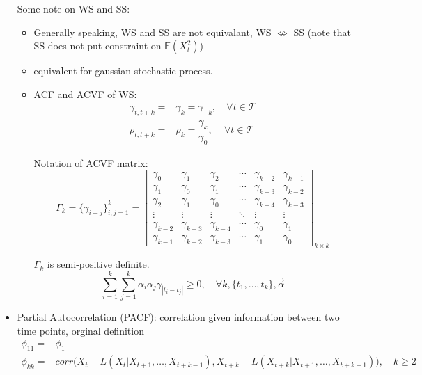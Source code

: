 \begin{itemize}[topsep=2pt,itemsep=0pt]
\begin{itemize}[topsep=2pt,itemsep=0pt]
        \end{itemize}

        Some note on WS and SS:
        \begin{itemize}[topsep=2pt,itemsep=0pt]
            \item Generally speaking, WS and SS are not equivalant, WS $ \nLeftrightarrow $ SS (note that SS does not put constraint on $ \mathbb{E}\left( X_t^2 \right)  $)
            \item equivalent for gaussian stochastic process.
            \item ACF and ACVF of WS: 
            \begin{align}
                \gamma _{t,t+k}=&\gamma _k=\gamma _{-k},\quad \forall t\in\mathcal{T}\\
                \rho _{t,t+k}=&\rho _k=\dfrac{\gamma _k}{\gamma _0},\quad\, \forall t\in\mathcal{T}
            \end{align}

            Notation of ACVF matrix:
            \begin{equation}
                \Gamma _k=\{\gamma _{i-j}\}_{i,j=1}^k=\begin{bmatrix}
                    \gamma _0&\gamma _1&\gamma _2&\cdots&\gamma _{k-2}&\gamma _{k-1}\\
                    \gamma _1&\gamma _0&\gamma _1&\cdots&\gamma _{k-3}&\gamma _{k-2}\\
                    \gamma _2&\gamma _1&\gamma _0&\cdots&\gamma _{k-4}&\gamma _{k-3}\\
                    \vdots&\vdots&\vdots&\ddots&\vdots&\vdots\\
                    \gamma _{k-2}&\gamma _{k-3}&\gamma _{k-4}&\cdots&\gamma _0&\gamma _1\\
                    \gamma _{k-1}&\gamma _{k-2}&\gamma _{k-3}&\cdots&\gamma _1&\gamma _0
                \end{bmatrix}_{k\times k}
            \end{equation}

            $ \Gamma _k $ is semi-positive definite. 
            \begin{equation}
                \sum_{i=1}^k\sum_{j=1}^k\alpha _i\alpha_ j\gamma _{|t_i-t_j|}\geq 0,\quad \forall k,\{t_1,\ldots,t_k\} ,\vec{\alpha }
            \end{equation}
            
        \end{itemize}
        \item Partial Autocorrelation (PACF): correlation given information between two time points, orginal definition
        \begin{align}\label{EqaPartialAutoCorrelation}
            \phi _{11}=&\phi _1\\
            \phi _{kk}=&corr\big(X_t-L(X_t|X_{t+1},\ldots,X_{t+k-1}),X_{t+k}-L(X_{t+k}|X_{t+1},\ldots,X_{t+k-1})\big),\quad k\geq 2
        \end{align}


\end{itemize}
